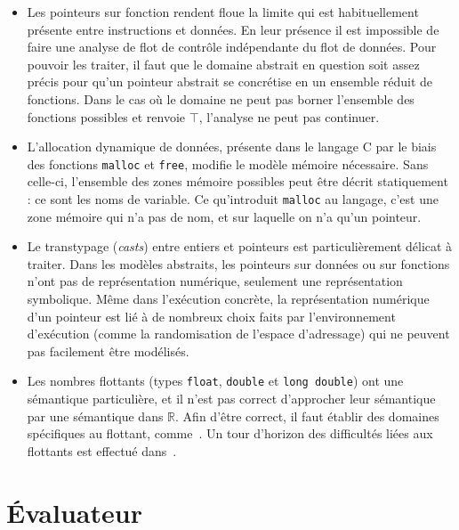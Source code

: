\begin{itemize}
\item
Les pointeurs sur fonction rendent floue la limite qui est habituellement
présente entre instructions et données. En leur présence il est impossible de
faire une analyse de flot de contrôle indépendante du flot de données. Pour
pouvoir les traiter, il faut que le domaine abstrait en question soit assez
précis pour qu'un pointeur abstrait se concrétise en un ensemble réduit de
fonctions. Dans le cas où le domaine ne peut pas borner l'ensemble des fonctions
possibles et renvoie $\top$, l'analyse ne peut pas continuer.

\item
L'allocation dynamique de données, présente dans le langage C par le biais des
fonctions \texttt{malloc} et \texttt{free}, modifie le modèle mémoire
nécessaire. Sans celle-ci, l'ensemble des zones mémoire possibles peut être
décrit statiquement : ce sont les noms de variable. Ce qu'introduit
\texttt{malloc} au langage, c'est une zone mémoire qui n'a pas de nom, et sur
laquelle on n'a qu'un pointeur.


\item
Le transtypage (\emph{casts}) entre entiers et pointeurs est particulièrement
délicat à traiter. Dans les modèles abstraits, les pointeurs sur données ou sur
fonctions n'ont pas de représentation numérique, seulement une représentation
symbolique. Même dans l'exécution concrète, la représentation numérique d'un
pointeur est lié à de nombreux choix faits par l'environnement d'exécution
(comme la randomisation de l'espace d'adressage) qui ne peuvent pas facilement
être modélisés.

\item
Les nombres flottants (types \texttt{float}, \texttt{double} et \texttt{long
double}) ont une sémantique particulière, et il n'est pas correct d'approcher
leur sémantique par une sémantique dans $ℝ$. Afin d'être correct, il faut
établir des domaines spécifiques au flottant, comme~\cite{floatpoly}. Un tour
d'horizon des difficultés liées aux flottants est effectué
dans~\cite{floatpitfalls}.

\end{itemize}



\section{Évaluateur} %

